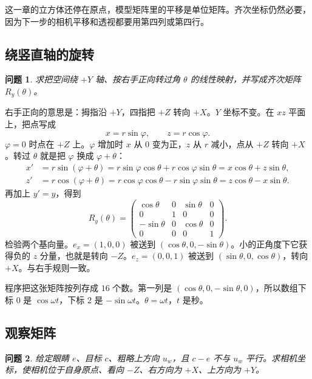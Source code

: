 \documentclass[12pt,a4paper]{article}
\theoremstyle{definition}
\theoremstyle{plain}
\newtheorem{problem}{问题}[section]
\theoremstyle{remark}
\begin{document}
这一章的立方体还停在原点，模型矩阵里的平移是单位矩阵。齐次坐标仍然必要，因为下一步的相机平移和透视都要用第四列或第四行。

\subsection{绕竖直轴的旋转}

\begin{problem}
求把空间绕 $+Y$ 轴、按右手正向转过角 $\theta$ 的线性映射，并写成齐次矩阵 $R_y(\theta)$。
\end{problem}

右手正向的意思是：拇指沿 $+Y$，四指把 $+Z$ 转向 $+X$。$Y$ 坐标不变。在 $xz$ 平面上，把点写成
\[
x=r\sin\varphi,\qquad z=r\cos\varphi.
\]
$\varphi=0$ 时点在 $+Z$ 上。$\varphi$ 增加时 $x$ 从 $0$ 变为正，$z$ 从 $r$ 减小，点从 $+Z$ 转向 $+X$。转过 $\theta$ 就是把 $\varphi$ 换成 $\varphi+\theta$：
\begin{align*}
x'&=r\sin(\varphi+\theta)
=r\sin\varphi\cos\theta+r\cos\varphi\sin\theta
=x\cos\theta+z\sin\theta,\\
z'&=r\cos(\varphi+\theta)
=r\cos\varphi\cos\theta-r\sin\varphi\sin\theta
=z\cos\theta-x\sin\theta.
\end{align*}
再加上 $y'=y$，得到
\begin{equation}
R_y(\theta)=
\begin{pmatrix}
\cos\theta&0&\sin\theta&0\\
0&1&0&0\\
-\sin\theta&0&\cos\theta&0\\
0&0&0&1
\end{pmatrix}.
\label{eq:ry}
\end{equation}
检验两个基向量。$e_x=(1,0,0)$ 被送到 $(\cos\theta,0,-\sin\theta)$。小的正角度下它获得负的 $z$ 分量，也就是转向 $-Z$。$e_z=(0,0,1)$ 被送到 $(\sin\theta,0,\cos\theta)$，转向 $+X$。与右手规则一致。

程序把这张矩阵按列存成 $16$ 个数。第一列是 $(\cos\theta,0,-\sin\theta,0)$，所以数组下标 $0$ 是 $\cos\omega t$，下标 $2$ 是 $-\sin\omega t$。$\theta=\omega t$，$t$ 是秒。

\subsection{观察矩阵}

\begin{problem}
给定眼睛 $e$、目标 $c$、粗略上方向 $u_w$，且 $c-e$ 不与 $u_w$ 平行。求相机坐标，使相机位于自身原点、看向 $-Z$、右方向为 $+X$、上方向为 $+Y$。
\end{problem}
\end{document}
